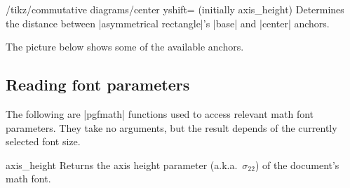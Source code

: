 \documentclass[a4paper]{ltxdoc}
\begin{document}
\begin{key}{/tikz/commutative diagrams/center yshift=
    (initially axis\_height)}
  Determines the distance between |asymmetrical rectangle|'s |base|
  and |center| anchors.
\end{key}

The picture below shows some of the available anchors.

\begin{center}\Huge
\end{center}


\subsection{Reading font parameters}
\label{sec:read-font-param}

The following are |pgfmath| functions used to access relevant math
font parameters.  They take no arguments, but the result depends of
the currently selected font size.

\begin{math-function}{axis\_height}
Returns the axis height parameter (a.k.a.\ $\sigma_{22}$) of the document's math font.
\end{math-function}
\end{document}
